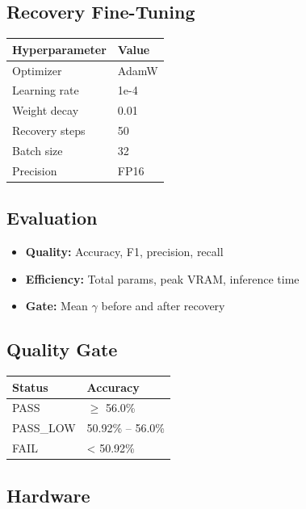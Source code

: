 \subsection{Recovery Fine-Tuning}

\begin{table}[H]
\centering
\small
\begin{tabular}{ll}
\toprule
\textbf{Hyperparameter} & \textbf{Value} \\
\midrule
Optimizer & AdamW \\
Learning rate & 1e-4 \\
Weight decay & 0.01 \\
Recovery steps & 50 \\
Batch size & 32 \\
Precision & FP16 \\
\bottomrule
\end{tabular}
\end{table}

\subsection{Evaluation}

\begin{itemize}
\item \textbf{Quality:} Accuracy, F1, precision, recall
\item \textbf{Efficiency:} Total params, peak VRAM, inference time
\item \textbf{Gate:} Mean $\gamma$ before and after recovery

\end{itemize}
\subsection{Quality Gate}

\begin{table}[H]
\centering
\small
\begin{tabular}{ll}
\toprule
\textbf{Status} & \textbf{Accuracy} \\
\midrule
PASS & $\ge$ 56.0\% \\
PASS\_LOW & 50.92\% -- 56.0\% \\
FAIL & \textless{} 50.92\% \\
\bottomrule
\end{tabular}
\end{table}

\subsection{Hardware}

